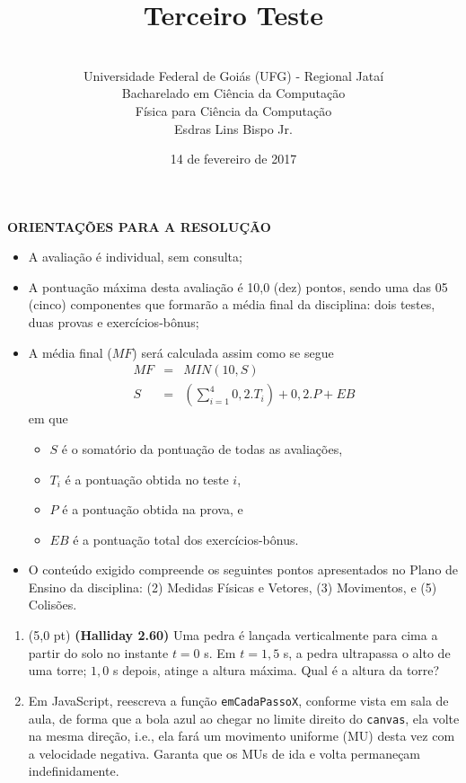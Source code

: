 \documentclass[12pt,a4paper,oneside]{article}
\author{\\Universidade Federal de Goiás (UFG) - Regional Jataí\\Bacharelado em Ciência da Computação \\Física para Ciência da Computação \\Esdras Lins Bispo Jr.}
\title{\sc \huge Terceiro Teste}
\date{14 de fevereiro de 2017}
\begin{document}
\maketitle

{\bf ORIENTAÇÕES PARA A RESOLUÇÃO}

\footnotesize

\begin{itemize}
	\item A avaliação é individual, sem consulta;
	\item A pontuação máxima desta avaliação é 10,0 (dez) pontos, sendo uma das 05 (cinco) componentes que formarão a média final da disciplina: dois testes, duas provas e exercícios-bônus;
	\item A média final ($MF$) será calculada assim como se segue
	\begin{eqnarray}
		MF & = & MIN(10, S) \nonumber \\
		S & = & (\sum_{i=1}^{4} 0,2.T_i ) + 0,2.P  + EB \nonumber
	\end{eqnarray}
	em que 
	\begin{itemize}
		\item $S$ é o somatório da pontuação de todas as avaliações,
		\item $T_i$ é a pontuação obtida no teste $i$,
		\item $P$ é a pontuação obtida na prova, e
		\item $EB$ é a pontuação total dos exercícios-bônus.
	\end{itemize}
	\item O conteúdo exigido compreende os seguintes pontos apresentados no Plano de Ensino da disciplina: (2) Medidas Físicas e Vetores, (3) Movimentos, e (5) Colisões.
\end{itemize}


\begin{center}
\end{center}

\newpage

\normalsize

\begin{enumerate}

	\item (5,0 pt) {\bf (Halliday 2.60)} Uma pedra é lançada verticalmente para cima a partir do solo no instante $t = 0$ s. Em  $t  = 1,5$ s, a pedra ultrapassa o alto de uma torre; $1,0$ s depois, atinge a altura máxima. Qual é a altura da torre?
	
	\item Em JavaScript, reescreva a função {\tt emCadaPassoX}, conforme vista em sala de aula, de forma que a bola azul ao chegar no limite direito do {\tt canvas}, ela volte na mesma direção, i.e., ela fará um movimento uniforme (MU) desta vez com a velocidade negativa. Garanta que os MUs de ida e volta permaneçam indefinidamente.
	
\end{enumerate}
\end{document}
